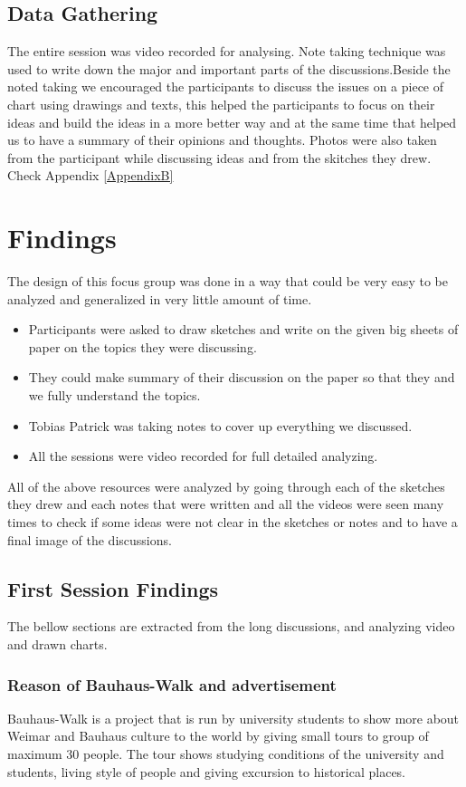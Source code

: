 \subsection{Data Gathering}
The entire session was video recorded for analysing. Note taking technique was used to write down the major and important parts of the discussions.Beside the noted taking we encouraged the participants to discuss the issues on a piece of chart using drawings and texts, this helped the participants to focus on their ideas and build the ideas in a more better way and at the same time that helped us to have a summary of their opinions and thoughts. Photos were also taken from the participant while discussing ideas and from the skitches they drew. Check Appendix \ref{AppendixB}


\section{Findings}
The design of this focus group was done in a way that could be very easy to be analyzed and generalized in very little amount of time. 

\begin {itemize}
\item	Participants were asked to draw sketches and write on the given big sheets of paper on the topics they were discussing.
\item	They could make summary of their discussion on the paper so that they and we fully understand the topics.
\item	Tobias Patrick was taking notes to cover up everything we discussed.
\item	All the sessions were video recorded for full detailed analyzing. 
\end{itemize}

All of the above resources were analyzed by going through each of the sketches they drew and each notes that were written and all the videos were seen many times to check if some ideas were not clear in the sketches or notes and to have a final image of the discussions.



\subsection {First Session Findings}
The bellow sections are extracted from the long discussions, and analyzing video and drawn charts.


\subsubsection{Reason of Bauhaus-Walk and advertisement}
Bauhaus-Walk is a project that is run by university students to show more about Weimar and Bauhaus culture to the world by giving small tours to group of maximum 30 people. The tour shows studying conditions of the university and students, living style of people and giving excursion to historical places.

